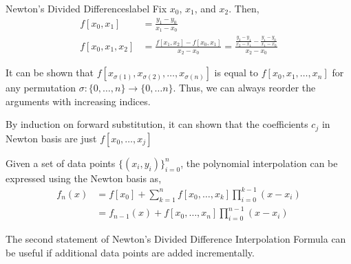 \begin{ex}{Newton's Divided Differences}{label}
Fix $x_0$, $x_1$, and $x_2$. Then,
\begin{align*}
    f\left[x_0, x_1\right] &=\frac{y_1-y_0}{x_1-x_0} \\
    f\left[x_0, x_1, x_2\right] &=\frac{f\left[x_1, x_2\right]-f\left[x_0, x_1\right]}{x_2-x_0}=\frac{\frac{y_2-y_1}{x_2-x_1}-\frac{y_1-y_0}{x_1-x_0}}{x_2-x_0}
\end{align*}
\end{ex}

\begin{marginfigure}
    It can be shown that $f[x_{\sigma(1)}, x_{\sigma(2)}, \ldots, x_{\sigma(n)}]$ is equal to $f\left[x_0, x_1, \ldots, x_n\right]$ for any permutation $\sigma:\{0, \ldots, n\} \rightarrow\{0, \ldots n\}$. Thus, we can always reorder the arguments with increasing indices.
\end{marginfigure}

\begin{rmk}
    By induction on forward substitution, it can shown that the coefficients $c_j$ in Newton basis are just $f\left[x_0, \ldots, x_j\right]$
\end{rmk}

\begin{thm}
    Given a set of data points $\{(x_i, y_i)\}_{i=0}^n$, the polynomial interpolation can be expressed using the Newton basis as,
    \begin{align*}
    f_n(x)
    &=f\left[x_0\right]+\sum_{k=1}^n f\left[x_0, \ldots, x_k\right] \prod_{i=0}^{k-1}\left(x-x_i\right) \\
    &= f_{n-1}(x)+f\left[x_0, \ldots, x_n\right] \prod_{i=0}^{n-1}\left(x-x_i\right)
    \end{align*}
\end{thm}

\begin{marginfigure}
    The second statement of Newton's Divided Difference Interpolation Formula can be useful if additional data points are added incrementally.
\end{marginfigure}

